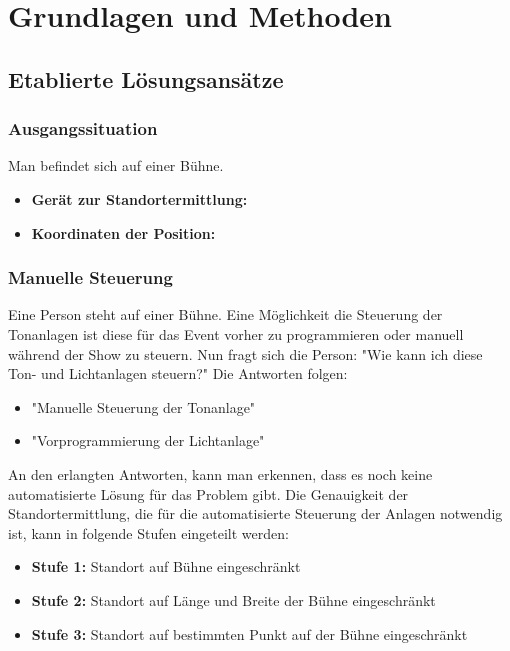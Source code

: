 
\pagestyle{fancy} \frenchspacing
\renewcommand{\chaptermark}[1]{\markboth{#1}{}}

\renewcommand{\textfraction}{0}
\renewcommand{\floatpagefraction}{0.999}
\renewcommand{\topfraction}{0.7}
\renewcommand{\bottomfraction}{0.999}
\lfoot{}

\chapter{Grundlagen und Methoden}

\section{Etablierte Lösungsansätze}

\subsection{Ausgangssituation}

Man befindet sich auf einer Bühne. 
\begin{itemize}
	\item \textbf{Gerät zur Standortermittlung: } 
	\item \textbf{Koordinaten der Position: }
\end{itemize}

\subsection{Manuelle Steuerung}
Eine Person steht auf einer Bühne. Eine Möglichkeit die Steuerung der Tonanlagen ist diese für das Event vorher zu programmieren oder manuell während der Show zu steuern. Nun fragt sich die Person: "Wie kann ich diese Ton- und Lichtanlagen steuern?" Die Antworten folgen:

\begin{itemize}
	\item "Manuelle Steuerung der Tonanlage"
	\item "Vorprogrammierung der Lichtanlage"
\end{itemize}

An den erlangten Antworten, kann man erkennen, dass es noch keine automatisierte Lösung für das Problem gibt. Die Genauigkeit der Standortermittlung, die für die automatisierte Steuerung der Anlagen notwendig ist, kann in folgende Stufen eingeteilt werden: 

\begin{itemize}
	\item \textbf{Stufe 1: }Standort auf Bühne eingeschränkt
	\item \textbf{Stufe 2: }Standort auf Länge und Breite der Bühne eingeschränkt
	\item \textbf{Stufe 3: }Standort auf bestimmten Punkt auf der Bühne eingeschränkt
\end{itemize}

